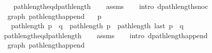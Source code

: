 \begin{isabellebody}
\endisataginvisible
{\isafoldinvisible}%
%
\isadeliminvisible
\isanewline
%
\endisadeliminvisible
%
\isadelimproof
\ \ %
\endisadelimproof
%
\isatagproof
{}\isamarkupfalse%
\ path{\isacharunderscore}{\kern0pt}length{\isacharunderscore}{\kern0pt}eq{\isacharunderscore}{\kern0pt}dpath{\isacharunderscore}{\kern0pt}length\isanewline
\ \ \isamarkupfalse%
\ assms\isanewline
\ \ \isamarkupfalse%
\ {\isacharparenleft}{\kern0pt}intro\ dpath{\isacharunderscore}{\kern0pt}length{\isacharunderscore}{\kern0pt}snoc{\isacharparenright}{\kern0pt}%
\endisatagproof
{\isafoldproof}%
%
\isadelimproof
\isanewline
%
\endisadelimproof
%
\isadeliminvisible
\isanewline
%
\endisadeliminvisible
%
\isataginvisible
{}\isamarkupfalse%
\ {\isacharparenleft}{\kern0pt}\ graph{\isacharparenright}{\kern0pt}\ path{\isacharunderscore}{\kern0pt}length{\isacharunderscore}{\kern0pt}append{\isacharcolon}{\kern0pt}\isanewline
\ \ \ {\isachardoublequoteopen}p\ {\isasymnoteq}\ {\isacharbrackleft}{\kern0pt}{\isacharbrackright}{\kern0pt}{\isachardoublequoteclose}\isanewline
\ \ \ {\isachardoublequoteopen}path{\isacharunderscore}{\kern0pt}length\ {\isacharparenleft}{\kern0pt}p\ {\isacharat}{\kern0pt}\ q{\isacharparenright}{\kern0pt}\ {\isacharequal}{\kern0pt}\ path{\isacharunderscore}{\kern0pt}length\ p\ {\isacharplus}{\kern0pt}\ path{\isacharunderscore}{\kern0pt}length\ {\isacharparenleft}{\kern0pt}last\ p\ {\isacharhash}{\kern0pt}\ q{\isacharparenright}{\kern0pt}{\isachardoublequoteclose}%
\endisataginvisible
{\isafoldinvisible}%
%
\isadeliminvisible
\isanewline
%
\endisadeliminvisible
%
\isadelimproof
\ \ %
\endisadelimproof
%
\isatagproof
{}\isamarkupfalse%
\ path{\isacharunderscore}{\kern0pt}length{\isacharunderscore}{\kern0pt}eq{\isacharunderscore}{\kern0pt}dpath{\isacharunderscore}{\kern0pt}length\isanewline
\ \ \isamarkupfalse%
\ assms\isanewline
\ \ \isamarkupfalse%
\ {\isacharparenleft}{\kern0pt}intro\ dpath{\isacharunderscore}{\kern0pt}length{\isacharunderscore}{\kern0pt}append{\isacharparenright}{\kern0pt}%
\endisatagproof
{\isafoldproof}%
%
\isadelimproof
\isanewline
%
\endisadelimproof
%
\isadeliminvisible
\isanewline
%
\endisadeliminvisible
%
\isataginvisible
{}\isamarkupfalse%
\ {\isacharparenleft}{\kern0pt}\ graph{\isacharparenright}{\kern0pt}\ path{\isacharunderscore}{\kern0pt}length{\isacharunderscore}{\kern0pt}append{\isacharunderscore}{\kern0pt}{}{\isacharcolon}{\kern0pt}\isanewline

\end{isabellebody}
